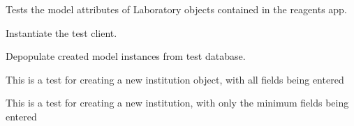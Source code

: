 \documentclass[letterpaper,10pt,english]{sphinxmanual}
\begin{document}
\begin{fulllineitems}
\label{api:experimentdb.sharing.tests.InstitutionModelTests}
Tests the model attributes of Laboratory objects contained in the reagents app.

\begin{fulllineitems}
\label{api:experimentdb.sharing.tests.InstitutionModelTests.setUp}
Instantiate the test client.

\end{fulllineitems}


\begin{fulllineitems}
\label{api:experimentdb.sharing.tests.InstitutionModelTests.tearDown}
Depopulate created model instances from test database.

\end{fulllineitems}


\begin{fulllineitems}
\label{api:experimentdb.sharing.tests.InstitutionModelTests.test_create_institution_all_fields}
This is a test for creating a new institution object, with all fields being entered

\end{fulllineitems}


\begin{fulllineitems}
\label{api:experimentdb.sharing.tests.InstitutionModelTests.test_create_institution_minimal}
This is a test for creating a new institution, with only the minimum fields being entered

\end{fulllineitems}


\end{fulllineitems}
\end{document}
